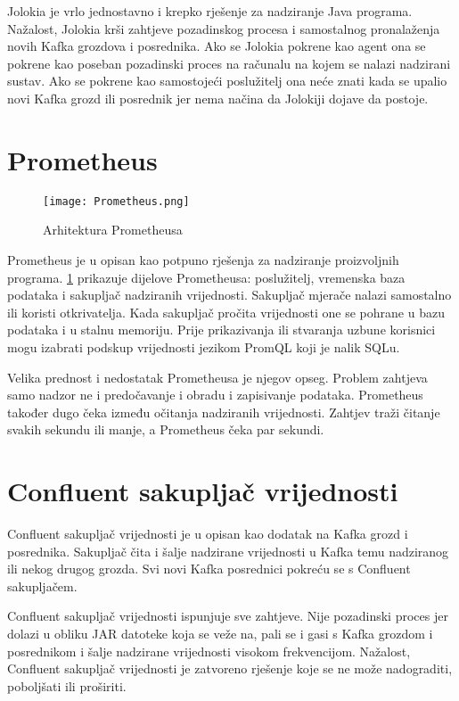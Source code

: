 \documentclass[times, utf8, diplomski, numeric]{fer}
\begin{document}
Jolokia je vrlo jednostavno i krepko rješenje za nadziranje Java programa. Nažalost, Jolokia krši zahtjeve pozadinskog procesa i samostalnog pronalaženja novih Kafka grozdova i posrednika. Ako se Jolokia pokrene kao agent ona se pokrene kao poseban pozadinski proces na računalu na kojem se nalazi nadzirani sustav. Ako se pokrene kao samostojeći poslužitelj ona neće znati kada se upalio novi Kafka grozd ili posrednik jer nema načina da Jolokiji dojave da postoje.

\section{Prometheus}

\begin{figure}[H]
    \centering
    \texttt{[image: Prometheus.png]}
    \caption{Arhitektura Prometheusa}
    \label{fig:prometheus}
\end{figure}

Prometheus je u \citep{prometheus} opisan kao potpuno rješenja za nadziranje proizvoljnih programa. \ref{fig:prometheus} prikazuje dijelove Prometheusa: poslužitelj, vremenska baza podataka i sakupljač nadziranih vrijednosti. Sakupljač mjerače nalazi samostalno ili koristi otkrivatelja. Kada sakupljač pročita vrijednosti one se pohrane u bazu podataka i u stalnu memoriju. Prije prikazivanja ili stvaranja uzbune korisnici mogu izabrati podskup vrijednosti jezikom PromQL koji je nalik SQLu.

Velika prednost i nedostatak Prometheusa je njegov opseg. Problem zahtjeva samo nadzor ne i predočavanje i obradu i zapisivanje podataka. Prometheus također dugo čeka između očitanja nadziranih vrijednosti. Zahtjev traži čitanje svakih sekundu ili manje, a Prometheus čeka par sekundi.

\section{Confluent sakupljač vrijednosti}

Confluent sakupljač vrijednosti je u \citep{confluent-metrics-reporter} opisan kao dodatak na Kafka grozd i posrednika. Sakupljač čita i šalje nadzirane vrijednosti u Kafka temu nadziranog ili nekog drugog grozda. Svi novi Kafka posrednici pokreću se s Confluent sakupljačem.

Confluent sakupljač vrijednosti ispunjuje sve zahtjeve. Nije pozadinski proces jer dolazi u obliku JAR datoteke koja se veže na, pali se i gasi s Kafka grozdom i posrednikom i šalje nadzirane vrijednosti visokom frekvencijom. Nažalost, Confluent sakupljač vrijednosti je zatvoreno rješenje koje se ne može nadograditi, poboljšati ili proširiti.
\end{document}

